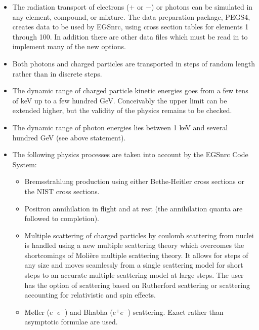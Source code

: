 \begin{itemize}
\item The radiation transport of electrons ($+$ or $-$) or photons
can be simulated in any element, compound, or mixture.
The data preparation package, PEGS4, creates data to be used by
EGSnrc, using cross section tables for elements 1 through 100. In addition
there are other data files which must be read in to implement many of the
new options.

\item Both photons and charged particles are transported in
steps of random length rather than in discrete steps.

\item The dynamic range of charged particle kinetic energies
goes from a few tens of keV up to a few hundred GeV.  Conceivably
the upper limit can be extended higher, but the validity of the
physics remains to be checked.

\item The dynamic range of photon energies lies between 1 keV and
several hundred GeV (see above statement).

\item The following physics processes are taken into account
by the EGSnrc Code System:

\begin{itemize}
  \item Bremsstrahlung production using either Bethe-Heitler cross sections
or the NIST cross sections.

  \item Positron annihilation in flight and at rest
  (the annihilation quanta are followed to completion).

  \item Multiple scattering of charged particles by coulomb scattering from
nuclei is handled using a new
multiple scattering theory which overcomes the shortcomings of Moli\`ere
multiple scattering theory. It allows for steps of any size and
moves seamlessly from a single scattering
model for short steps to an  accurate multiple scattering model
at large steps.  The user has the option of scattering based on
Rutherford scattering or scattering accounting for relativistic and spin
effects.

  \item M\o ller ($e^-e^-$) and Bhabha ($e^+e^-$) scattering.
  Exact rather than asymptotic formulae are used.


\end{itemize}
\end{itemize}
